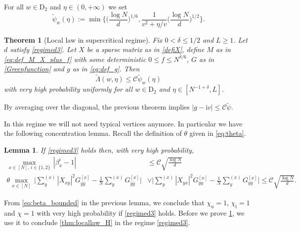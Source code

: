 \documentclass[10pt,a4paper]{amsart}
\newcommand{\ii}{\mathrm{i}}
\newtheorem{thm}[thhm]{Theorem}
\newtheorem{lemma}{Lemma}[section]
\numberwithin{equation}{section}
\newcommand*\bset[1]{[#1]}
\newcommand*\ubarr[1]{{\widehat{#1}}}
\begin{document}
	For all $w\in \mathrm{D}_2$ and $\eta \in (0, +\infty)$ we set
	\begin{equation*}
		\widetilde{\psi}_w(\eta) := \min \biggl\{ \biggl(\frac{\log N}{d} \biggr)^{1/6} , \frac{1}{v^2 + \eta/v} \biggl(\frac{\log N}{d}\biggr)^{1/2} \biggr\}.
	\end{equation*}
	
	
	
	\begin{thm}[Local law in supercritical regime]\label{thm:locallaw3}
		Fix $ 0 < \delta \le 1/2$ and $L \ge 1$. Let $d$ satisfy \eqref{regimed3}. Let $X$ be a sparse matrix as in \cref{defiX}, define $M$ as in \eqref{eq:def_M_X_plus_f} with some deterministic $0 \le f \le N^{\delta/6}$, $G$ as in \eqref{Greenfunction} and $g$ as in \eqref{eq:def_g}. 
		Then  
		\begin{equation*}
			\widetilde{\Lambda}(w,\eta) \le \mathcal C \widetilde{\psi}_w(\eta)
		\end{equation*}
		with very high probability uniformly for all $w \in \mathrm{D}_2$ and $\eta \in [N^{-1 + \delta}, L]$.
	\end{thm}
	
	By averaging over the diagonal, the previous theorem implies 
	$ |g- \ii v | \leq \mathcal C \widetilde{\psi}$.
	
	
	
	In this regime we will not need typical vertices anymore. In particular we have the following concentration lemma. Recall the definition of $\theta$ given in \eqref{eq:theta}.
	\begin{lemma}\label{lem:sumXabGa_eq_sumGa}
		If \eqref{regimed3} holds then,  
		with very high probability,
		\begin{align}
			\label{eq:beta_bounded}
			\max_{x \in [N],\, i \in \{1,2\}}\, |\beta_{x}^i -1| & \le \mathcal C  \sqrt{\frac{\log N}{d} } \\ 
			\label{eq:all_vert_typi}
			\theta\max_{x \in [N]} \, \biggl|\sum_{y}^{(x)} |X_{xy}|^2G_{\ubarr{y}\ubarr{y}}^{\bset{x}} - \frac{1}{N}\sum_{y}^{(x)} G_{\ubarr{y}\ubarr{y}}^{\bset{x}}\biggr| 
			& \vee
			\biggl|\sum_{y}^{(x)}  |X_{yx}|^2G_{yy}^{\bset{x}} - \frac{1}{N} \sum_{y}^{(x)}  G_{yy}^{\bset{x}}\biggr| \le \mathcal{C}  \sqrt{\frac{\log N}{d} }.
		\end{align}
	\end{lemma}
	From \eqref{eq:beta_bounded} in the previous lemma, we conclude that $\chi_{\mathrm u} = 1$, $\chi_\mathrm{l} = 1$ and $\chi = 1$ with very high probability if \eqref{regimed3} holds.
	Before we prove \cref{lem:sumXabGa_eq_sumGa}, we use it to conclude 
	\cref{thm:locallaw_H} in the regime \eqref{regimed3}. 
	
\end{document}
